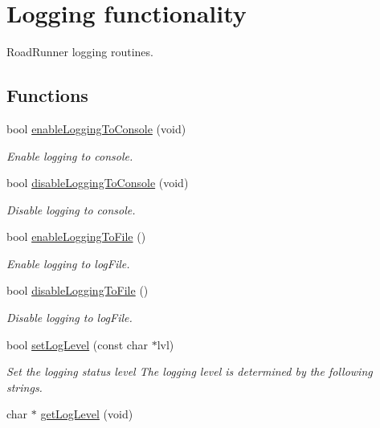 \hypertarget{group__logging}{\section{Logging functionality}
\label{group__logging}
}


Road\+Runner logging routines.  


\subsection*{Functions}
\begin{DoxyCompactItemize}
\item 
bool \hyperlink{group__logging_ga1289bf0c4cc9c078d53d82b60e8dbdbb}{enable\+Logging\+To\+Console} (void)
\begin{DoxyCompactList}\small\item\em Enable logging to console. \end{DoxyCompactList}\item 
bool \hyperlink{group__logging_ga894d611c74147f5cd1dcb64c1a758b5e}{disable\+Logging\+To\+Console} (void)
\begin{DoxyCompactList}\small\item\em Disable logging to console. \end{DoxyCompactList}\item 
bool \hyperlink{group__logging_ga768513a67f7bb4faceedb0fd377d63eb}{enable\+Logging\+To\+File} ()
\begin{DoxyCompactList}\small\item\em Enable logging to log\+File. \end{DoxyCompactList}\item 
bool \hyperlink{group__logging_gac1f91b27feb5ffdb19c6d54f3013d7e0}{disable\+Logging\+To\+File} ()
\begin{DoxyCompactList}\small\item\em Disable logging to log\+File. \end{DoxyCompactList}\item 
bool \hyperlink{group__logging_gad113b4e32a079d7a8c1d188561e1ffbc}{set\+Log\+Level} (const char $\ast$lvl)
\begin{DoxyCompactList}\small\item\em Set the logging status level The logging level is determined by the following strings. \end{DoxyCompactList}\item 
char $\ast$ \hyperlink{group__logging_gab140cb9d963dc39925115865d5d63640}{get\+Log\+Level} (void)

\end{DoxyCompactItemize}
